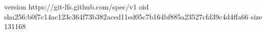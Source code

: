 version https://git-lfs.github.com/spec/v1
oid sha256:b0f7c14ac123c364f73b382aced11ed05c7b164bf885a23527cfd39c4d4ffa66
size 131168
